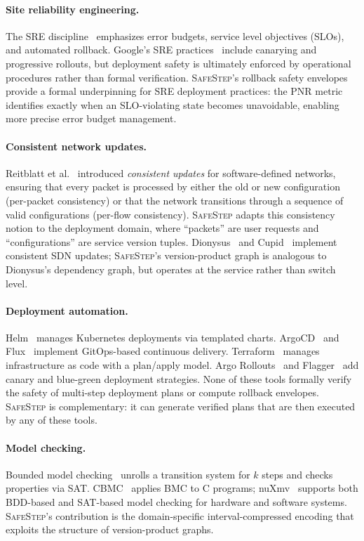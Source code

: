 \documentclass[10pt,twocolumn]{article}
\newcommand{\safestep}{\textsc{SafeStep}}
\begin{document}
\paragraph{Site reliability engineering.}
The SRE discipline~\cite{beyer-sre-2016} emphasizes error
budgets, service level objectives (SLOs), and automated
rollback. Google's SRE practices~\cite{beyer-sre-2016} include
canarying and progressive rollouts, but deployment safety is
ultimately enforced by operational procedures rather than formal
verification. \safestep{}'s rollback safety envelopes provide
a formal underpinning for SRE deployment practices: the PNR
metric identifies exactly when an SLO-violating state becomes
unavoidable, enabling more precise error budget management.

\paragraph{Consistent network updates.}
Reitblatt et al.~\cite{reitblatt-consistent-2012} introduced
\emph{consistent updates} for software-defined networks,
ensuring that every packet is processed by either the old or
new configuration (per-packet consistency) or that the network
transitions through a sequence of valid configurations
(per-flow consistency). \safestep{} adapts this consistency
notion to the deployment domain, where ``packets'' are user
requests and ``configurations'' are service version tuples.
Dionysus~\cite{jin-dionysus-2014} and Cupid~\cite{mcgeer-cupid-2013}
implement consistent SDN updates; \safestep{}'s version-product
graph is analogous to Dionysus's dependency graph, but operates
at the service rather than switch level.

\paragraph{Deployment automation.}
Helm~\cite{helm} manages Kubernetes deployments via templated
charts. ArgoCD~\cite{argocd} and Flux~\cite{flux} implement
GitOps-based continuous delivery. Terraform~\cite{terraform}
manages infrastructure as code with a plan/apply model.
Argo Rollouts~\cite{argo-rollouts} and
Flagger~\cite{flagger} add canary and blue-green deployment
strategies. None of these tools formally verify the safety of
multi-step deployment plans or compute rollback envelopes.
\safestep{} is complementary: it can generate verified plans
that are then executed by any of these tools.

\paragraph{Model checking.}
Bounded model checking~\cite{biere-bmc-2003} unrolls a
transition system for $k$ steps and checks properties via
SAT. CBMC~\cite{cbmc} applies BMC to C programs; nuXmv~\cite{nuxmv}
supports both BDD-based and SAT-based model checking for
hardware and software systems. \safestep{}'s contribution is
the domain-specific interval-compressed encoding that exploits
the structure of version-product graphs.
\end{document}

